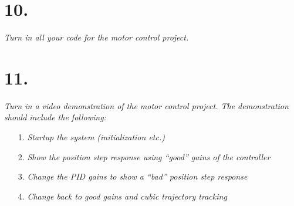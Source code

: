 \documentclass[12pt]{article}
\begin{document}
\section*{10.}
\textit{Turn in all your code for the motor control project.}

\section*{11.}
\textit{Turn in a video demonstration of the motor control project.  The demonstration should include the following:}
\begin{enumerate}
    \item[1.]
    \textit{Startup the system (initialization etc.)}

    \item[2.]
    \textit{Show the position step response using “good” gains of the controller}

    \item[3.]
    \textit{Change the PID gains to show a “bad” position step response}

    \item[4.]
    \textit{Change back to good gains and cubic trajectory tracking}
\end{enumerate}
\end{document}
